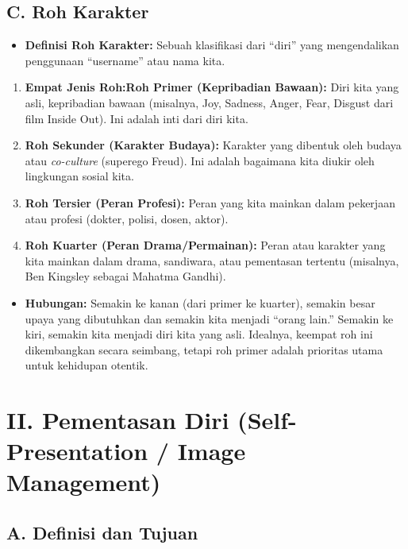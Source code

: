 \documentclass[
  letterpaper,
  DIV=11,
  numbers=noendperiod]{scrreprt}
\providecommand{\tightlist}{%
  \setlength{\itemsep}{0pt}\setlength{\parskip}{0pt}}
\begin{document}
\subsection{C. Roh Karakter}\label{c.-roh-karakter}

\begin{itemize}
\tightlist
\item
  \textbf{Definisi Roh Karakter:} Sebuah klasifikasi dari ``diri'' yang
  mengendalikan penggunaan ``username'' atau nama kita.
\end{itemize}

\begin{enumerate}
\def\labelenumi{\arabic{enumi}.}
\tightlist
\item
  \textbf{Empat Jenis Roh:Roh Primer (Kepribadian Bawaan):} Diri kita
  yang asli, kepribadian bawaan (misalnya, Joy, Sadness, Anger, Fear,
  Disgust dari film Inside Out). Ini adalah inti dari diri kita.
\item
  \textbf{Roh Sekunder (Karakter Budaya):} Karakter yang dibentuk oleh
  budaya atau \emph{co-culture} (superego Freud). Ini adalah bagaimana
  kita diukir oleh lingkungan sosial kita.
\item
  \textbf{Roh Tersier (Peran Profesi):} Peran yang kita mainkan dalam
  pekerjaan atau profesi (dokter, polisi, dosen, aktor).
\item
  \textbf{Roh Kuarter (Peran Drama/Permainan):} Peran atau karakter yang
  kita mainkan dalam drama, sandiwara, atau pementasan tertentu
  (misalnya, Ben Kingsley sebagai Mahatma Gandhi).
\end{enumerate}

\begin{itemize}
\tightlist
\item
  \textbf{Hubungan:} Semakin ke kanan (dari primer ke kuarter), semakin
  besar upaya yang dibutuhkan dan semakin kita menjadi ``orang lain.''
  Semakin ke kiri, semakin kita menjadi diri kita yang asli. Idealnya,
  keempat roh ini dikembangkan secara seimbang, tetapi roh primer adalah
  prioritas utama untuk kehidupan otentik.
\end{itemize}

\section{II. Pementasan Diri (Self-Presentation / Image
Management)}\label{ii.-pementasan-diri-self-presentation-image-management}

\subsection{A. Definisi dan Tujuan}\label{a.-definisi-dan-tujuan}
\end{document}
